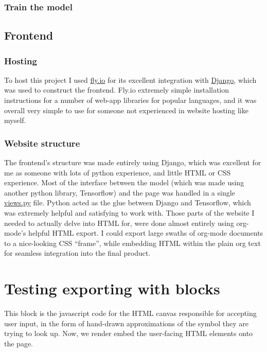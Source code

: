 \documentclass[11pt]{article}
\begin{document}
\subsubsection{Train the model}
\label{sec:orgc51da67}
\subsection{Frontend}
\label{sec:org6177b26}
\subsubsection{Hosting}
\label{sec:org0c472c7}
To host this project I used \href{https://fly.io/}{fly.io} for its excellent integration with \href{https://www.djangoproject.com/}{Django}, which was used to construct the frontend. Fly.io extremely simple installation instructions for a number of web-app libraries for popular languages, and it was overall very simple to use for someone not experienced in website hosting like myself.
\subsubsection{Website structure}
\label{sec:org20a0569}
The frontend's structure was made entirely using Django, which was excellent for me as someone with lots of python experience, and little HTML or CSS experience.
Most of the interface between the model (which was made using another python library, Tensorflow) and the page was handled in a single \href{frontend/untexifyweb/untexify/views.py}{views.py} file. Python acted as the glue between Django and Tensorflow, which was extremely helpful and satisfying to work with.
Those parts of the website I needed to actually delve into HTML for, were done almost entirely using org-mode's helpful HTML export. I could export large swaths of org-mode documents to a nice-looking CSS ``frame'', while embedding HTML within the plain org text for seamless integration into the final product.

\section{Testing exporting with blocks}
\label{sec:org621c799}
This block is the javascript code for the HTML canvas responsible for accepting user input, in the form of hand-drawn approximations of the symbol they are trying to look up.
Now, we render embed the user-facing HTML elements onto the page.
\end{document}
